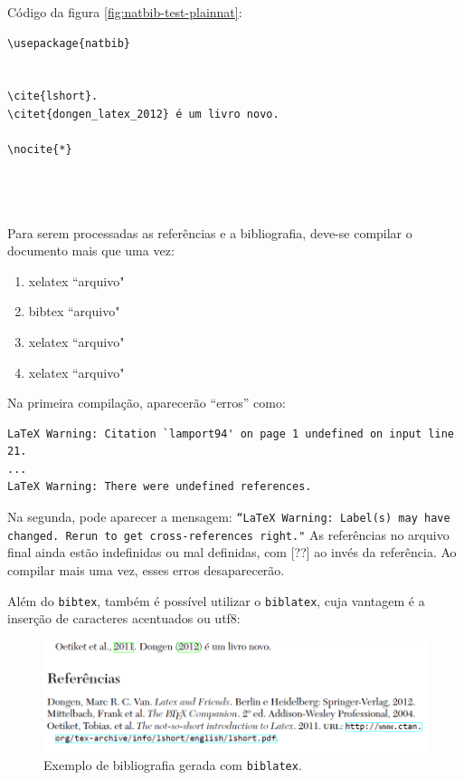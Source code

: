 Código da figura \ref{fig:natbib-test-plainnat}:

\begin{verbatim}
\usepackage{natbib}


\cite{lshort}.
\citet{dongen_latex_2012} é um livro novo.

\nocite{*}




\end{verbatim}



Para serem processadas as referências e a bibliografia, deve-se compilar o documento mais que uma vez:

\begin{enumerate}
\item xelatex ``arquivo" \item 
bibtex ``arquivo" \item
xelatex ``arquivo" \item 
xelatex ``arquivo" 
\end{enumerate}


Na primeira compilação, aparecerão ``erros'' como:

\begin{verbatim}
LaTeX Warning: Citation `lamport94' on page 1 undefined on input line 21.
...
LaTeX Warning: There were undefined references.
\end{verbatim}


Na segunda, pode aparecer a mensagem: \texttt{``LaTeX Warning: Label(s) may have changed. Rerun to get cross-references right."} As referências no arquivo final ainda estão indefinidas ou mal definidas, com [??] ao invés da referência. Ao compilar mais uma vez, esses erros desaparecerão.

Além do \texttt{bibtex}, também é possível utilizar o \texttt{biblatex}, cuja vantagem é a inserção de caracteres acentuados ou utf8:

\begin{figure}
\centering
\includegraphics[width=0.7\linewidth]{./biblatex-figura}
\caption{Exemplo de bibliografia gerada com \texttt{biblatex}.}
\label{fig:biblatex-figura}
\end{figure}

